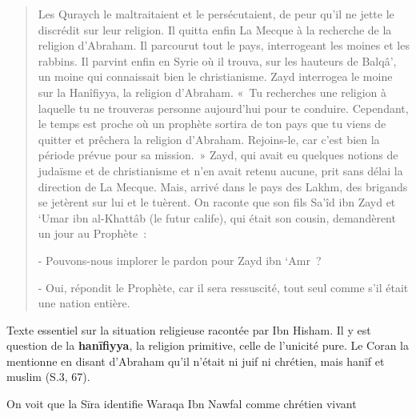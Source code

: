 \begin{quotation}
Les Quraych le maltraitaient et le persécutaient, de peur qu'il ne jette
le discrédit sur leur religion. Il quitta enfin La Mecque à la recherche
de la religion d'Abraham. Il parcourut tout le pays, interrogeant les
moines et les rabbins. Il parvint enfin en Syrie où il trouva, sur les
hauteurs de Balqâ', un moine qui connaissait bien le christianisme. Zayd
interrogea le moine sur la Hanîfiyya, la religion d'Abraham. «~Tu
recherches une religion à laquelle tu ne trouveras personne aujourd'hui
pour te conduire. Cependant, le temps est proche où un prophète sortira
de ton pays que tu viens de quitter et prêchera la religion d'Abraham.
Rejoins-le, car c'est bien la période prévue pour sa mission.~» Zayd,
qui avait eu quelques notions de judaïsme et de christianisme et n'en
avait retenu aucune, prit sans délai la direction de La Mecque. Mais,
arrivé dans le pays des Lakhm, des brigands se jetèrent sur lui et le
tuèrent. On raconte que son fils Sa'îd ibn Zayd et `Umar ibn al-Khattâb
(le futur calife), qui était son cousin, demandèrent un jour au
Prophète~:

- Pouvons-nous implorer le pardon pour Zayd ibn `Amr~?

- Oui, répondit le Prophète, car il sera ressuscité, tout seul comme
s'il était une nation entière.
\end{quotation}
{Texte essentiel sur la situation religieuse racontée par Ibn
Hisham. Il y est question de la \textbf{hanīfiyya}, la religion primitive, celle
de l'unicité pure. Le Coran la mentionne en disant d'Abraham qu'il
n'était ni juif ni chrétien, mais hanīf et muslim (S.3, 67).}

On voit que la Sīra identifie Waraqa Ibn Nawfal comme chrétien vivant


